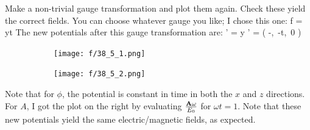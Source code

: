 \item Make a non-trivial gauge transformation and plot them again.
Check these yield the correct fields.
\newline You can choose whatever gauge you like; I chose this one:
\be
f = yt
\ee
The new potentials after this gauge transformation are:
\be
\phi' = y \quad\quad\quad \bA' = \bigg( -,\, -t,\, 0 \bigg)
\ee

\begin{figure}[h!]
\begin{center}
\begin{subfigure}[h]{.46\textwidth}
    \begin{center}
    \texttt{[image: f/38\_5\_1.png]}
    \end{center}
\end{subfigure}
\begin{subfigure}[h]{.48\textwidth}
    \begin{center}
    \texttt{[image: f/38\_5\_2.png]}
    \end{center}
\end{subfigure}
\end{center}
\end{figure}
Note that for $\phi$, the potential is constant in time in both the $x$ and $z$ directions. For $A$, I got the plot on the right by evaluating $\frac{{\bf A} \omega}{E_0}$ for $\omega t = 1$. Note that these new potentials yield the same electric/magnetic fields, as expected.

\enu
%

